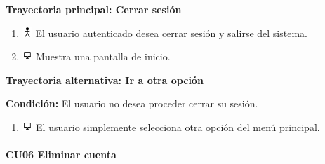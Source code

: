 \textbf{Trayectoria principal: Cerrar sesión}
\begin{enumerate}
\item \includegraphics[height=1em]{pictures/actor.png} El usuario autenticado desea cerrar sesión y salirse del sistema.
\item \includegraphics[height=1em]{pictures/sistema.png} Muestra una pantalla de inicio.
\end{enumerate} \bigskip


\textbf{Trayectoria alternativa: Ir a otra opción} 

\vspace{0.3em}

\textbf{Condición:} El usuario no desea proceder cerrar su sesión.
\begin{enumerate}
\item \includegraphics[height=1em]{pictures/sistema.png} El usuario simplemente selecciona otra opción del menú principal.
\end{enumerate} \bigskip



\paragraph{CU06 Eliminar cuenta}

